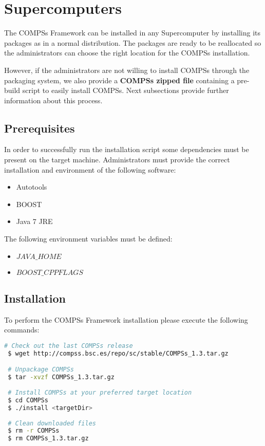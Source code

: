 \section{Supercomputers}
\label{sec:Supercomputers}

The COMPSs Framework can be installed in any Supercomputer by installing its packages as in a normal distribution. The packages are
ready to be reallocated so the administrators can choose the right location for the COMPSs installation. \newline

However, if the administrators are not willing to install COMPSs through the packaging system, we also provide a \textbf{COMPSs 
zipped file} containing a pre-build script to easily install COMPSs. Next subsections provide further information about this process.

\subsection{Prerequisites}
In order to successfully run the installation script some dependencies must be present on the target machine. Administrators must 
provide the correct installation and environment of the following software:
\begin{itemize}
 \item Autotools
 \item BOOST
 \item Java 7 JRE
\end{itemize}

The following environment variables must be defined:
\begin{itemize}
 \item $JAVA\_HOME$
 \item $BOOST\_CPPFLAGS$
\end{itemize}

\subsection{Installation}
To perform the COMPSs Framework installation please execute the following commands:
\begin{lstlisting}[language=bash]
 # Check out the last COMPSs release
 $ wget http://compss.bsc.es/repo/sc/stable/COMPSs_1.3.tar.gz

 # Unpackage COMPSs
 $ tar -xvzf COMPSs_1.3.tar.gz
 
 # Install COMPSs at your preferred target location
 $ cd COMPSs
 $ ./install <targetDir>
 
 # Clean downloaded files
 $ rm -r COMPSs
 $ rm COMPSs_1.3.tar.gz
\end{lstlisting}

